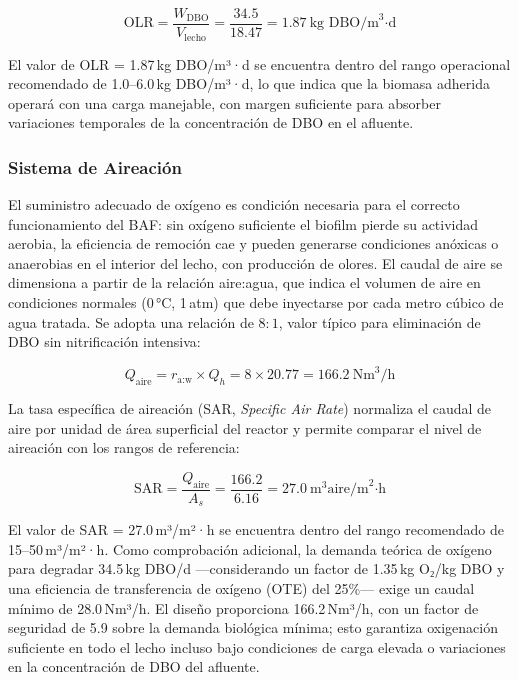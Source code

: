 \documentclass[12pt,a4paper]{article}
\begin{document}
\begin{equation}
\text{OLR} = \frac{W_{\text{DBO}}}{V_{\text{lecho}}} = \frac{34.5}{18.47} = 1.87\ \text{kg DBO/m}^3\text{·d}
\end{equation}

El valor de OLR = 1.87\,kg DBO/m³·d se encuentra dentro del rango operacional recomendado de 1.0--6.0\,kg DBO/m³·d, lo que indica que la biomasa adherida operará con una carga manejable, con margen suficiente para absorber variaciones temporales de la concentración de DBO en el afluente.

\subsubsection*{Sistema de Aireación}

El suministro adecuado de oxígeno es condición necesaria para el correcto funcionamiento del BAF: sin oxígeno suficiente el biofilm pierde su actividad aerobia, la eficiencia de remoción cae y pueden generarse condiciones anóxicas o anaerobias en el interior del lecho, con producción de olores. El caudal de aire se dimensiona a partir de la relación aire:agua, que indica el volumen de aire en condiciones normales (0\,°C, 1\,atm) que debe inyectarse por cada metro cúbico de agua tratada. Se adopta una relación de $8:1$, valor típico para eliminación de DBO sin nitrificación intensiva:

\begin{equation}
Q_{\text{aire}} = r_{\text{a:w}} \times Q_{h} = 8 \times 20.77 = 166.2\ \text{Nm}^3\text{/h}
\end{equation}

La tasa específica de aireación (SAR, \textit{Specific Air Rate}) normaliza el caudal de aire por unidad de área superficial del reactor y permite comparar el nivel de aireación con los rangos de referencia:

\begin{equation}
\text{SAR} = \frac{Q_{\text{aire}}}{A_{s}} = \frac{166.2}{6.16} = 27.0\ \text{m}^3\text{aire/m}^2\text{·h}
\end{equation}

El valor de SAR = 27.0\,m³/m²·h se encuentra dentro del rango recomendado de 15--50\,m³/m²·h. Como comprobación adicional, la demanda teórica de oxígeno para degradar 34.5\,kg DBO/d —considerando un factor de 1.35\,kg O₂/kg DBO y una eficiencia de transferencia de oxígeno (OTE) del 25\%— exige un caudal mínimo de 28.0\,Nm³/h. El diseño proporciona 166.2\,Nm³/h, con un factor de seguridad de 5.9 sobre la demanda biológica mínima; esto garantiza oxigenación suficiente en todo el lecho incluso bajo condiciones de carga elevada o variaciones en la concentración de DBO del afluente.
\end{document}
